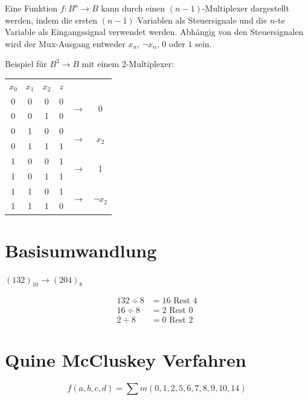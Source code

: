 \documentclass[a4paper,6pt]{article}
\begin{document}
\begin{multicols*}{3}
Eine Funktion $ f : B^n \rightarrow B $ kann durch einen $ (n-1) $-Multiplexer dargestellt werden, indem die ersten $ (n-1) $ Variablen als Steuersignale und die $ n $-te Variable als Eingangssignal verwendet werden. Abhängig von den Steuersignalen wird der Mux-Ausgang entweder $ x_n $, $ \neg x_n $, $ 0 $ oder $ 1 $ sein.

Beispiel für $ B^3 \rightarrow B $ mit einem 2-Multiplexer:

\begin{center}
   \begin{tabular}{ccc|c|cc}
    $ x_0 $ & $ x_1 $ & $ x_2 $ & $ z $ & & \\
    \cline{1-6}
    0 & 0 & 0 & 0 & \multirow{2}{*}{$ \rightarrow $} & \multirow{2}{*}{0} \\
    0 & 0 & 1 & 0 & & \\
    \cline{1-6}
    0 & 1 & 0 & 0 & \multirow{2}{*}{$ \rightarrow $} & \multirow{2}{*}{$ x_2 $} \\
    0 & 1 & 1 & 1 & & \\
    \cline{1-6}
    1 & 0 & 0 & 1 & \multirow{2}{*}{$ \rightarrow $} & \multirow{2}{*}{1} \\
    1 & 0 & 1 & 1 & & \\
    \cline{1-6}
    1 & 1 & 0 & 1 & \multirow{2}{*}{$ \rightarrow $} & \multirow{2}{*}{$ \neg x_2 $} \\
    1 & 1 & 1 & 0 & & \\
    \cline{1-6}
    \end{tabular} 
\end{center}


\section{Basisumwandlung}
$ (132)_{10} \rightarrow (204)_{8}$

\begin{align*}
132 \div 8 &= 16 \text{ Rest } 4 \\
16 \div 8 &= 2 \text{ Rest } 0 \\
2 \div 8 &= 0 \text{ Rest } 2
\end{align*}
    

\section{Quine McCluskey Verfahren}
\small
$$
f(a,b,c,d) = \sum m(0,1,2,5,6,7,8,9,10,14)
$$
\scriptsize


\end{multicols*}
\end{document}
